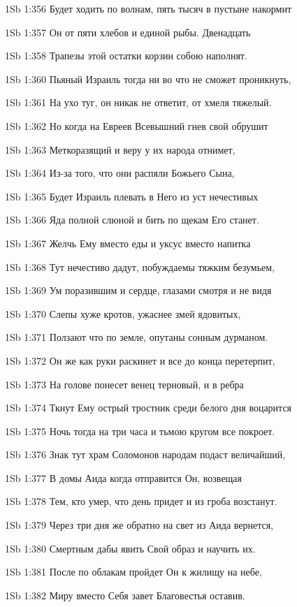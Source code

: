 \vs 1Sb 1:356 Будет ходить по волнам, пять тысяч в пустыне накормит

\vs 1Sb 1:357 Он от пяти хлебов и единой рыбы. Двенадцать

\vs 1Sb 1:358 Трапезы этой остатки корзин собою наполнят.

\vs 1Sb 1:360 Пьяный Израиль тогда ни во что не сможет проникнуть,

\vs 1Sb 1:361 На ухо туг, он никак не ответит, от хмеля тяжелый.

\vs 1Sb 1:362 Но когда на Евреев Всевышний гнев свой обрушит

\vs 1Sb 1:363 Меткоразящий и веру у их народа отнимет,

\vs 1Sb 1:364 Из-за того, что они распяли Божьего Сына,

\vs 1Sb 1:365 Будет Израиль плевать в Него из уст нечестивых

\vs 1Sb 1:366 Яда полной слюной и бить по щекам Его станет.

\vs 1Sb 1:367 Желчь Ему вместо еды и уксус вместо напитка

\vs 1Sb 1:368 Тут нечестиво дадут, побуждаемы тяжким безумьем,

\vs 1Sb 1:369 Ум поразившим и сердце, глазами смотря и не видя 

\vs 1Sb 1:370 Слепы хуже кротов, ужаснее змей ядовитых,

\vs 1Sb 1:371 Ползают что по земле, опутаны сонным дурманом.

\vs 1Sb 1:372 Он же как руки раскинет и все до конца перетерпит,

\vs 1Sb 1:373 На голове понесет венец терновый, и в ребра

\vs 1Sb 1:374 Ткнут Ему острый тростник  среди белого дня воцарится

\vs 1Sb 1:375 Ночь тогда на три часа и тьмою кругом все покроет.

\vs 1Sb 1:376 Знак тут храм Соломонов народам подаст величайший,

\vs 1Sb 1:377 В домы Аида когда отправится Он, возвещая

\vs 1Sb 1:378 Тем, кто умер, что день придет  и из гроба возстанут.

\vs 1Sb 1:379 Через три дня же обратно на свет из Аида вернется,

\vs 1Sb 1:380 Смертным дабы явить Свой образ и научить их.

\vs 1Sb 1:381 После по облакам пройдет Он к жилищу на небе,

\vs 1Sb 1:382 Миру вместо Себя завет Благовестья оставив.

